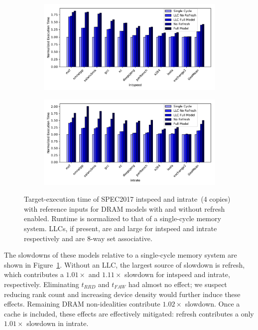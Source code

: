 \begin{figure}
    \centering
    \begin{subfigure}[t]{0.49\textwidth}
        \includegraphics[width=\columnwidth]{figures/dram_fidelity_speed_slowdown.pdf}
    \end{subfigure}
    \begin{subfigure}[t]{0.49\textwidth}
        \includegraphics[width=\columnwidth]{figures/dram_fidelity_rate_slowdown.pdf}
    \end{subfigure}
    \caption{Target-execution time of SPEC2017 intspeed and intrate~(4 copies)
    with reference inputs for DRAM models with and without refresh enabled.
    Runtime is normalized to that of a single-cycle memory system. LLCs, if
    present, are  and  large for intspeed and
    intrate respectively and are 8-way set associative.}
    \label{fig:model-fidelity-sweep}
\end{figure}

The slowdowns of these models relative to a single-cycle memory system are
shown in Figure~\ref{fig:model-fidelity-sweep}. Without an LLC, the largest
source of slowdown is refresh, which contributes a $1.01\times$ and
$1.11\times$ slowdown for intspeed and intrate, respectively.  Eliminating $t_{RRD}$ and $t_{FAW}$ had almost no effect; we
suspect reducing rank count and increasing device density would further induce these
effects.  Remaining DRAM non-idealities contribute $1.02\times$ slowdown.  Once
a cache is included, these effects are effectively mitigated: refresh
contributes a only $1.01\times$ slowdown in intrate.

